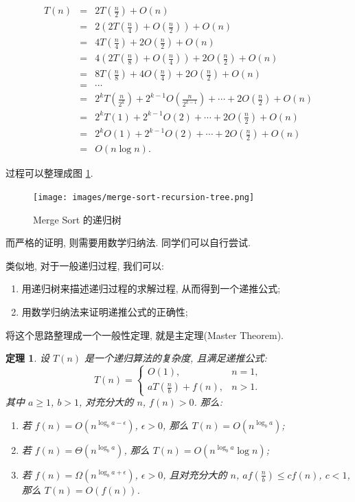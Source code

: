 \documentclass[a4paper]{ctexart}
\newtheorem{theorem}{定理}
\theoremstyle{definition}
\theoremstyle{definition}
\begin{document}
\begin{eqnarray*}
T(n) &=& 2 T(\frac{n}{2}) + O(n) \\
&=& 2(2 T(\frac{n}{4}) + O(\frac{n}{2})) + O(n) \\
&=& 4 T(\frac{n}{4}) + 2 O(\frac{n}{2}) + O(n) \\
&=& 4(2 T(\frac{n}{8}) + O(\frac{n}{4})) + 2 O(\frac{n}{2}) + O(n) \\
&=& 8 T(\frac{n}{8}) + 4 O(\frac{n}{4}) + 2 O(\frac{n}{2}) + O(n) \\
&=& \cdots \\
&=& 2^k T(\frac{n}{2^k}) + 2^{k - 1} O(\frac{n}{2^{k - 1}}) + \cdots + 2 O(\frac{n}{2}) + O(n) \\
&=& 2^k T(1) + 2^{k - 1} O(2) + \cdots + 2 O(\frac{n}{2}) + O(n) \\
&=& 2^k O(1) + 2^{k - 1} O(2) + \cdots + 2 O(\frac{n}{2}) + O(n) \\
&=& O(n \log n).
\end{eqnarray*}

过程可以整理成图 \ref{fig:merge-sort-recursion-tree}.

\begin{figure}[htbp]
  \centering
  \texttt{[image: images/merge-sort-recursion-tree.png]}
  \caption{Merge Sort 的递归树}
  \label{fig:merge-sort-recursion-tree}
\end{figure}

而严格的证明, 则需要用数学归纳法. 同学们可以自行尝试.

类似地, 对于一般递归过程, 我们可以:
\begin{enumerate}
  \item 用递归树来描述递归过程的求解过程, 从而得到一个递推公式;
  \item 用数学归纳法来证明递推公式的正确性;
\end{enumerate}
将这个思路整理成一个一般性定理, 就是主定理(Master Theorem).

\begin{theorem}
  设 $T(n)$ 是一个递归算法的复杂度, 且满足递推公式:
  \begin{equation}
    T(n) = \left\{
      \begin{array}{ll}
       O(1), & n = 1, \\
        a T(\frac{n}{b}) + f(n), & n > 1.
      \end{array}
    \right.
  \end{equation}
  其中 $a \geq 1$, $b > 1$, 对充分大的 $n$, $f(n) > 0$. 那么:
  \begin{enumerate}
    \item 若 $f(n) = O(n^{\log_b a - \epsilon})$, $\epsilon > 0$, 那么 $T(n) = O(n^{\log_b a})$;
    \item 若 $f(n) = \Theta(n^{\log_b a})$, 那么 $T(n) = O(n^{\log_b a} \log n)$;
    \item 若 $f(n) = \Omega(n^{\log_b a + \epsilon})$, $\epsilon > 0$, 且对充分大的 $n$, $a f(\frac{n}{b}) \leq c f(n)$, $c < 1$, 那么 $T(n) = O(f(n))$.
  \end{enumerate}
\end{theorem}
\end{document}
